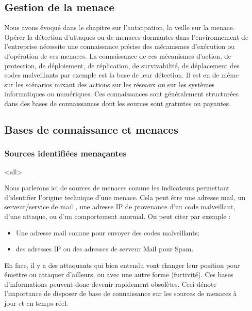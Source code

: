 \subsection{Gestion de la menace}

Nous avons évoqué dans le chapitre sur l'anticipation, la veille sur la menace. 
Opérer la détection d'attaques ou de menaces dormantes dans l'environnement de l'entreprise nécessite une connaissance précise des mécanismes d'exécution ou d'opération de ces menaces.
La connaissance de ces mécanismes d'action, de protection, de déploiement, de réplication, de survivabilité, de déplacement des codes malveillants par exemple est la base de leur détection. Il est en de même sur les scénarios mixant des actions sur les réseaux ou sur les systèmes informatiques ou numériques.
Ces connaissances sont généralement structurées dans des bases de connaissances dont les sources sont gratuites ou payantes.

\subsection{Bases de connaissance et menaces}

\subsubsection{Sources identifiées menaçantes}

\mode<all>{
{
Nous parlerons ici de sources de menaces comme les indicateurs permettant d'identifier l'origine technique d'une menace. Cela peut être une adresse mail, un serveur/service de mail , une adresse IP de provenance d'un code malveillant, d'une attaque, ou d'un comportement anormal.
On peut citer par exemple  :
\begin{itemize}
  \item Une adresse mail connue pour envoyer des codes malveillants;
  \item des adresses IP ou des adresses de serveur Mail pour Spam.
\end{itemize}
}}%


En face, il y a des attaquants qui bien entendu vont changer leur position pour émettre ou attaquer d'ailleurs, ou avec une autre forme (furtivité). Ces bases d'informations peuvent donc devenir rapidement obsolètes. Ceci dénote l'importance de disposer de base de connaissance sur les sources de menaces à jour et en temps réel.

